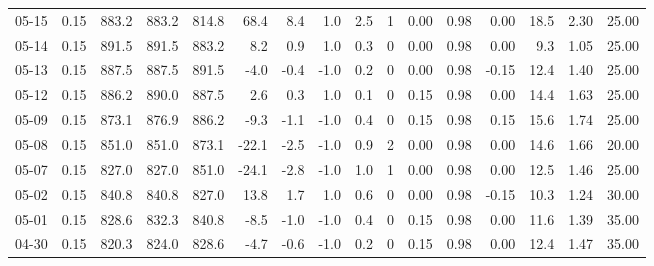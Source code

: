 \begin{threeparttable}
{\begin{tabular}{lrrrrrrrrrrrrrrr}
  05-15 &     0.15 & 883.2 & 883.2 & 814.8 &       68.4 &            8.4 &                      1.0 &                 2.5 &              1 &       0.00 &      0.98 &           0.00 &             18.5 &            2.30 &                  25.00 \\
  05-14 &     0.15 & 891.5 & 891.5 & 883.2 &        8.2 &            0.9 &                      1.0 &                 0.3 &              0 &       0.00 &      0.98 &           0.00 &              9.3 &            1.05 &                  25.00 \\
  05-13 &     0.15 & 887.5 & 887.5 & 891.5 &       -4.0 &           -0.4 &                     -1.0 &                 0.2 &              0 &       0.00 &      0.98 &          -0.15 &             12.4 &            1.40 &                  25.00 \\
  05-12 &     0.15 & 886.2 & 890.0 & 887.5 &        2.6 &            0.3 &                      1.0 &                 0.1 &              0 &       0.15 &      0.98 &           0.00 &             14.4 &            1.63 &                  25.00 \\
  05-09 &     0.15 & 873.1 & 876.9 & 886.2 &       -9.3 &           -1.1 &                     -1.0 &                 0.4 &              0 &       0.15 &      0.98 &           0.15 &             15.6 &            1.74 &                  25.00 \\
  05-08 &     0.15 & 851.0 & 851.0 & 873.1 &      -22.1 &           -2.5 &                     -1.0 &                 0.9 &              2 &       0.00 &      0.98 &           0.00 &             14.6 &            1.66 &                  20.00 \\
  05-07 &     0.15 & 827.0 & 827.0 & 851.0 &      -24.1 &           -2.8 &                     -1.0 &                 1.0 &              1 &       0.00 &      0.98 &           0.00 &             12.5 &            1.46 &                  25.00 \\
  05-02 &     0.15 & 840.8 & 840.8 & 827.0 &       13.8 &            1.7 &                      1.0 &                 0.6 &              0 &       0.00 &      0.98 &          -0.15 &             10.3 &            1.24 &                  30.00 \\
  05-01 &     0.15 & 828.6 & 832.3 & 840.8 &       -8.5 &           -1.0 &                     -1.0 &                 0.4 &              0 &       0.15 &      0.98 &           0.00 &             11.6 &            1.39 &                  35.00 \\
  04-30 &     0.15 & 820.3 & 824.0 & 828.6 &       -4.7 &           -0.6 &                     -1.0 &                 0.2 &              0 &       0.15 &      0.98 &           0.00 &             12.4 &            1.47 &                  35.00 \\

\end{tabular}}
\end{threeparttable}
